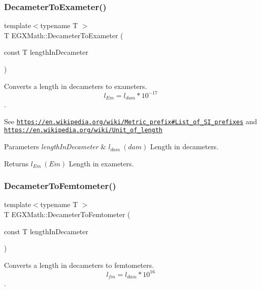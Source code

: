 \subsubsection{\texorpdfstring{Decameter\+To\+Exameter()}{DecameterToExameter()}}
{\footnotesize\ttfamily template$<$typename T $>$ \\
T E\+G\+X\+Math\+::\+Decameter\+To\+Exameter (\begin{DoxyParamCaption}\item[{const T}]{length\+In\+Decameter }\end{DoxyParamCaption})}



Converts a length in decameters to exameters. \[ l_{Em}=l_{dam} * 10^{-17} \]. 

See \href{https://en.wikipedia.org/wiki/Metric_prefix#List_of_SI_prefixes}{\tt https\+://en.\+wikipedia.\+org/wiki/\+Metric\+\_\+prefix\#\+List\+\_\+of\+\_\+\+S\+I\+\_\+prefixes} and \href{https://en.wikipedia.org/wiki/Unit_of_length}{\tt https\+://en.\+wikipedia.\+org/wiki/\+Unit\+\_\+of\+\_\+length} 
\begin{DoxyParams}{Parameters}
{\em length\+In\+Decameter} & $ l_{dam}\ (dam)$ Length in decameters. \\
\hline
\end{DoxyParams}
\begin{DoxyReturn}{Returns}
$ l_{Em}\ (Em)$ Length in exameters. 
\end{DoxyReturn}
\mbox{\label{group___e_g_x_math-_conversions-_length_conversions-_s_i-_decameter-_s_i_gae42b64853340c10623d206afbc6a9ff4}} 
\subsubsection{\texorpdfstring{Decameter\+To\+Femtometer()}{DecameterToFemtometer()}}
{\footnotesize\ttfamily template$<$typename T $>$ \\
T E\+G\+X\+Math\+::\+Decameter\+To\+Femtometer (\begin{DoxyParamCaption}\item[{const T}]{length\+In\+Decameter }\end{DoxyParamCaption})}



Converts a length in decameters to femtometers. \[ l_{fm}=l_{dam} * 10^{16} \]. 

